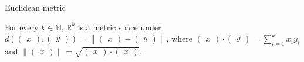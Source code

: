 \begin{theorem}{Euclidean metric}

For every \(k \in \mathbb{N}\), \(\mathbb{R}^{k}\) is a metric space under \(d\left( {\begin{pmatrix}
x
\end{pmatrix},\begin{pmatrix}
y
\end{pmatrix}} \right) = \left\| {\begin{pmatrix}
x
\end{pmatrix} - \begin{pmatrix}
y
\end{pmatrix}} \right\|\), where \(\begin{pmatrix}
x
\end{pmatrix} \cdot \begin{pmatrix}
y
\end{pmatrix} = \sum_{i = 1}^{k}x_{i}y_{i}\) and \(\left\| \begin{pmatrix}
x
\end{pmatrix} \right\| = \sqrt{\begin{pmatrix}
x
\end{pmatrix} \cdot \begin{pmatrix}
x
\end{pmatrix}}\).

\end{theorem}

